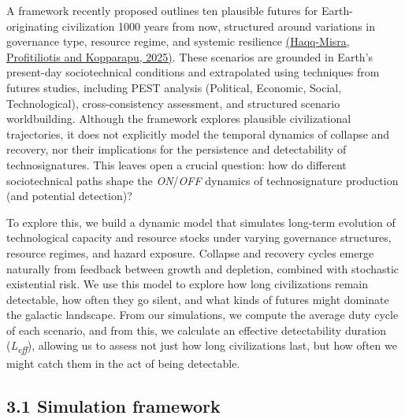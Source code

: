 A framework recently proposed outlines ten plausible futures for Earth-originating civilization 1000 years from now, structured around variations in governance type, resource regime, and systemic resilience \href{https://paperpile.com/c/hQuIW4/AWHk}{(Haqq-Misra, Profitiliotis and Kopparapu, 2025)}. These scenarios are grounded in Earth's present-day sociotechnical conditions and extrapolated using techniques from futures studies, including PEST analysis (Political, Economic, Social, Technological), cross-consistency assessment, and structured scenario worldbuilding. Although the framework explores plausible civilizational trajectories, it does not explicitly model the temporal dynamics of collapse and recovery, nor their implications for the persistence and detectability of technosignatures. This leaves open a crucial question: how do different sociotechnical paths shape the \emph{ON}/\emph{OFF} dynamics of technosignature production (and potential detection)?

To explore this, we build a dynamic model that simulates long-term evolution of technological capacity and resource stocks under varying governance structures, resource regimes, and hazard exposure. Collapse and recovery cycles emerge naturally from feedback between growth and depletion, combined with stochastic existential risk. We use this model to explore how long civilizations remain detectable, how often they go silent, and what kinds of futures might dominate the galactic landscape. From our simulations, we compute the average duty cycle of each scenario, and from this, we calculate an effective detectability duration (\emph{L\textsubscript{eff}}), allowing us to assess not just how long civilizations last, but how often we might catch them in the act of being detectable.

\subsection{3.1 Simulation framework}\label{simulation-framework}

